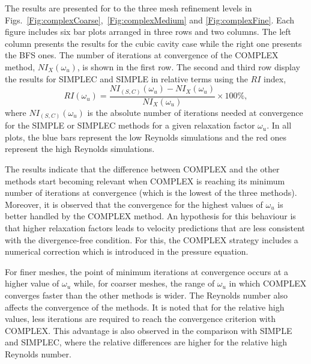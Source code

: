 \documentclass[final,3p,times,11pt,onecolumn]{myElsarticle}
\numberwithin{equation}{section}
\begin{document}
The results are presented for to the three mesh refinement levels in Figs.~\ref{Fig:complexCoarse},~\ref{Fig:complexMedium} and \ref{Fig:complexFine}. Each figure includes six bar plots arranged in three rows and two columns. The left column presents the results for the cubic cavity case while the right one presents the BFS ones. The number of iterations at convergence of the COMPLEX method, $NI_X(\omega_u)$, is shown in the first row. The second and third row display the results for SIMPLEC and SIMPLE in relative terms using the $RI$ index,
\begin{equation}
RI(\omega_u)
=
\dfrac
{NI_{(S,C)}(\omega_u) - NI_X(\omega_u)}
{NI_X(\omega_u)}
\times
100\%,
\end{equation}
where $NI_{(S,C)}(\omega_u)$ is the absolute number of iterations needed at convergence for the SIMPLE or SIMPLEC methods for a given relaxation factor $\omega_u$. 
In all plots, the blue bars represent the low Reynolds simulations and the red ones represent the high Reynolds simulations.

The results indicate that the difference between COMPLEX and the other methods start becoming relevant when COMPLEX is reaching its minimum number of iterations at convergence (which is the lowest of the three methods). Moreover, it is observed that the convergence for the highest values of $\omega_u$ is better handled by the COMPLEX method. An hypothesis for this behaviour is that higher relaxation factors leads to velocity predictions that are less consistent with the divergence-free condition. For this, the COMPLEX strategy includes a numerical correction which is introduced in the pressure equation.


For finer meshes, the point of minimum iterations at convergence occurs at a higher value of $\omega_u$ while, for coarser meshes, the range of $\omega_u$ in which COMPLEX converges faster than the other methods is wider. The Reynolds number also affects the convergence of the methods. It is noted that for the relative high values, less iterations are required to reach the convergence criterion with COMPLEX. This advantage is also observed in the comparison with SIMPLE and SIMPLEC, where the relative differences are higher for the relative high Reynolds number.
\end{document}

